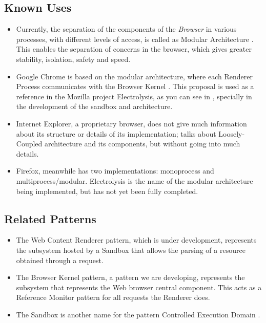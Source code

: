 \documentclass{sig-alternate-05-2015}
\begin{document}
  \subsection*{Known Uses}
  \begin{itemize}
    \item Currently, the separation of the components of the \textit{Browser} in various processes, with different levels of access, is called as Modular Architecture \cite{Vrbanec2013}. This enables the separation of concerns in the browser, which gives greater stability, isolation, safety and speed.
    \item Google Chrome is based on the modular architecture, where each Renderer Process communicates with the Browser Kernel \cite{multiProcGC}. This proposal is used as a reference in the Mozilla project Electrolysis, as you can see in \cite{FirefoxThreatModel,featuresE10S}, specially in the development of the sandbox and architecture.
    \item Internet Explorer, a proprietary browser, does not give much information about its structure or details of its implementation; \cite{Crowley2010} talks about Loosely-Coupled architecture \cite{IE8-LCIE} and its components, but without going into much details. 
    \item Firefox, meanwhile has two implementations: monoprocess and multiprocess/modular. Electrolysis is the name of the modular architecture being implemented, but has not yet been fully completed.
  \end{itemize}

  \subsection*{Related Patterns}
  \begin{itemize}
    \item The Web Content Renderer pattern, which is under development, represents the subsystem hosted by a Sandbox that allows the parsing of a resource obtained through a request.
    \item The Browser Kernel pattern, a pattern we are developing, represents the subsystem that represents the Web browser central component. This acts as a Reference Monitor pattern \cite{fernandez2013security} for all requests the Renderer does.
    \item The Sandbox is another name for the pattern Controlled Execution Domain \cite{fernandez2013security}.
  \end{itemize}
\end{document}
